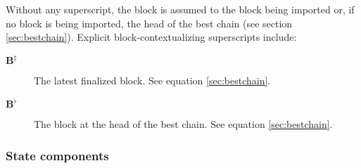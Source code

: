 Without any superscript, the block is assumed to the block being imported or, if no block is being imported, the head of the best chain (see section \ref{sec:bestchain}). Explicit block-contextualizing superscripts include:
\begin{description}
  \item[$\mathbf{B}^\natural$] The latest finalized block. See equation \ref{sec:bestchain}.
  \item[$\mathbf{B}^\flat$] The block at the head of the best chain. See equation \ref{sec:bestchain}.
\end{description}

\subsubsection{State components}

